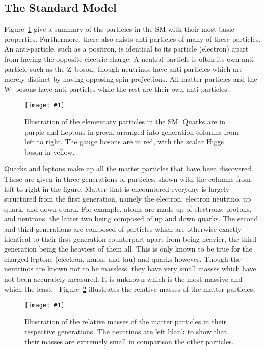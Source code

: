 \documentclass[twocolumn]{article}
\newcommand{\insertFigure}[1]{%
   \texttt{[image: \#1]}%
}
\begin{document}
\subsection{The Standard Model}
Figure~\ref{fig:part} give a summary of the particles in the SM with their most basic properties. Furthermore, there also exists anti-particles of many of these particles. An anti-particle, such as a positron, is identical to its particle (electron) apart from having the opposite electric charge. A neutral particle is often its own anti-particle such as the Z~boson, though neutrinos have anti-particles which are merely distinct by having opposing spin projections. All matter particles and the W~bosons have anti-particles while the rest are their own anti-particles.
\begin{figure}[!h]
	\centering
	\insertFigure{Images/SM.png}
	\caption{Illustration of the elementary particles in the SM. Quarks are in purple and Leptons in green, arranged into generation columns from left to right. The gauge bosons are in red, with the scalar Higgs boson in yellow.~\cite{part}}
	\label{fig:part}
\end{figure}
Quarks and leptons make up all the matter particles that have been discovered. These are given in three generations of particles, shown with the columns from left to right in the figure. Matter that is encountered everyday is largely structured from the first generation, namely the electron, electron neutrino, up quark, and down quark. For example, atoms are made up of electrons, protons, and neutrons, the latter two being composed of up and down quarks. The second and third generations are composed of particles which are otherwise exactly identical to their first generation counterpart apart from being heavier, the third generation being the heaviest of them all. This is only known to be true for the charged leptons (electron, muon, and tau) and quarks however. Though the neutrinos are known not to be massless, they have very small masses which have not been accurately measured. It is unknown which is the most massive and which the least.~\cite{Thompson} Figure~\ref{fig:mass} illustrates the relative masses of the matter particles.
\begin{figure}[!h]
	\centering
	\insertFigure{Images/mass.png}
	\caption{Illustration of the relative masses of the matter particles in their respective generations. The neutrinos are left blank to show that their masses are extremely small in comparison the other particles.~\cite{Thompson}}
	\label{fig:mass}
\end{figure}
\end{document}
